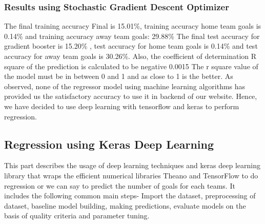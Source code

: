 \subsubsection{Results using Stochastic Gradient Descent Optimizer }
The final training accuracy Final is 15.01\%, training accuracy home team goals is 0.14\% and training accuracy away team goals: 29.88\% \newline
The final test accuracy for gradient booster is 15.20\% , test accuracy for home team goals is 0.14\% and test accuracy for away team goals is 30.26\%. Also, the coefficient of determination R square of the prediction is calculated to be negative 0.0015 \newline 
The r square value of the model must be in between 0 and 1 and as close to 1 is the better.\newline
As observed, none of the regressor model using machine learning algorithms has provided us the satisfactory accuracy to use it in backend of our website. Hence, we have decided to use deep learning with tensorflow and keras to perform regression.\newline \newline
\subsection{Regression using Keras Deep Learning }
This part describes the usage of deep learning techniques and keras deep learning library that wraps the efficient numerical libraries Theano and TensorFlow to do regression or we can say to predict the number of goals for each teams. It includes the following common main steps- Import the dataset, preprocessing of dataset, baseline model building, making predictions, evaluate models on the basis of quality criteria and parameter tuning. %
